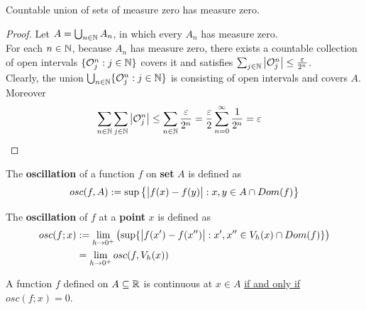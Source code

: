 \documentclass[11pt]{article}
\begin{document}
	\begin{theorem}
		Countable union of sets of measure zero has measure zero.
	\end{theorem}
	
	\begin{proof}
		Let $A = \bigcup_{n\in \mathbb{N}} A_n$, in which every $A_n$ has measure zero. \\
		For each $n \in \mathbb{N}$, because $A_n$ has measure zero, there exists a countable collection of open intervals $\{\mathcal{{O}}^n_j: j \in \mathbb{N}\}$ covers it and satisfies $\sum_{j \in \mathbb{N}} \big \vert {\mathcal{{O}}^n_j} \big \vert \leq \frac{\varepsilon}{2^n}$. \\
		Clearly, the union $\bigcup_{n \in \mathbb{N}} \{\mathcal{{O}}^n_j: j \in \mathbb{N}\}$ is consisting of open intervals and covers $A$. \\
		Moreover
		\begin{align}
			\sum_{n\in\mathbb{N}} \sum_{j\in\mathbb{N}} \big \vert {\mathcal{{O}}^n_j} \big \vert &\leq \sum_{n\in\mathbb{N}} \frac{\varepsilon}{2^n} = \frac{\varepsilon}{2} \sum_{n=0}^\infty \frac{1}{2^n} = \varepsilon
		\end{align}
	\end{proof}
	
	\begin{definition}
		The \textbf{oscillation} of a function $f$ on \textbf{set} $A$ is defined as
		\begin{align}
			osc(f, A) := \sup\left\{
			\big \vert {f(x) - f(y)} \big \vert: x, y \in A \cap Dom(f)
			\right\}
		\end{align}
	\end{definition}
	
	\begin{definition}
		The \textbf{oscillation} of $f$ at a \textbf{point} $x$ is defined as
		\begin{align}
			osc(f; x) &:=\lim_{h \to 0^+} \left(
			\sup\{
			\big \vert {f(x') - f(x'')} \big \vert: x', x'' \in V_h(x) \cap Dom(f)
			\}
			\right) \\
			&= \lim_{h \to 0^+} osc(f, V_h(x))
		\end{align}
	\end{definition}
	
	\begin{theorem}
		A function $f$ defined on $A \subseteq \mathbb{R}$ is continuous at $x \in A$ \ul{if and only if} $osc(f;x) = 0$.
	\end{theorem}
	
\end{document}
